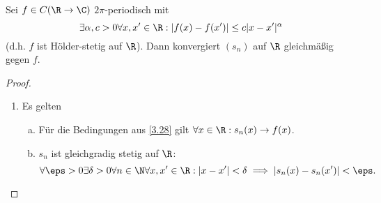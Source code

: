 \begin{st} \label{3.30}
	Sei $f \in C(\R \to \C)$ $2\pi$-periodisch mit
	\[
		\exists \alpha, c > 0 \forall x, x' \in \R : |f(x) - f(x')| \le c | x -x'|^\alpha
	\]
	(d.h. $f$ ist Hölder-stetig auf $\R$).
	Dann konvergiert $(s_n)$ auf $\R$ gleichmäßig gegen $f$.
	\begin{proof}
		\begin{enumerate}[1]
			\item
				Es gelten
				\begin{enumerate}[a)]
					\item
						Für die Bedingungen aus \ref{3.28} gilt $\forall x \in \R : s_n(x) \to f(x)$.
					\item
						$s_n$ ist gleichgradig stetig auf $\R$:
						\[
							\forall \eps > 0 \exists \delta > 0 \forall n \in \N \forall x,x' \in \R : |x-x'|< \delta \implies |s_n(x)-s_n(x')| < \eps.
						\]


\end{enumerate}
\end{enumerate}
\end{proof}
\end{st}
